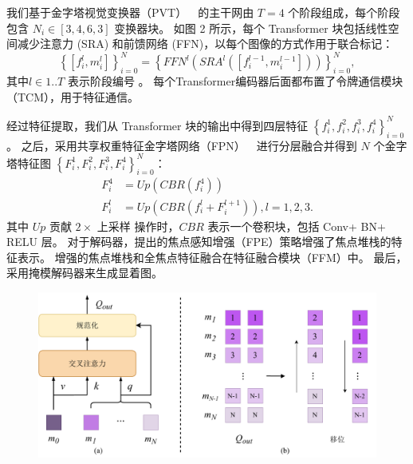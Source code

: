 %
%
%
%
%
\par
我们基于金字塔视觉变换器（PVT）~\cite{wang2022pvt}~的主干网由 $T = 4$ 个阶段组成，每个阶段包含
$ N_{i} \in [3,4,6,3] $ 变换器块。 如图 2 所示，每个 Transformer 块包括线性空间减少注意力 (SRA) 和前馈网络 (FFN)，以每个图像的方式作用于联合标记：
\begin{equation}
	\left \{ [f_{i}^{l}, m_{i}^{l}]\right \}_{i=0}^{N} = \left \{ FFN^{l} \left  ( SRA^{l} \left ( [f_{i}^{l-1}, m_{i}^{l-1}]\right )\right )\right \}_{i=0}^{N},
\end{equation}
其中$ l \in 1..T $ 表示阶段编号 。 每个Transformer编码器后面都布置了令牌通信模块（TCM），用于特征通信。 
%
%
%
%
%
\par
经过特征提取，我们从 Transformer 块的输出中得到四层特征 
$\left \{ f_{i}^{1},f_{i}^{2},f_{i}^{3},f_{i}^{4} \right \}_{i=0}^{N}$ 。 
之后，采用共享权重特征金字塔网络（FPN）~\cite{lin2017feature}~进行分层融合并得到 $N$ 个金字塔特征图	$ \left \{F_{i}^{1},F_{i}^{2},F_{i}^{3},F_{i}^{4} \right \}_{i=0}^{N}$：
\begin{equation}
	\begin{aligned}
		F_{i}^{4} &= Up \left ( CBR \left ( f_{i}^{4} \right )\right ) \\ 
		F_{i}^{l} &= Up \left ( CBR \left ( f_{i}^{l} + F_{i}^{l+1} \right )  \right ),l=1,2,3  .
	\end{aligned}
\end{equation}
其中 $Up$ 贡献 $2 \times $ 上采样 操作时，$CBR$ 表示一个卷积块，包括 Conv+ BN+ RELU 层。 对于解码器，提出的焦点感知增强（FPE）策略增强了焦点堆栈的特征表示。 增强的焦点堆栈和全焦点特征融合在特征融合模块（FFM）中。 最后，采用掩模解码器来生成显着图。
%
%
%
%
%
%
%
%
%
%
\begin{figure}[!ht]
	\centering
	\includegraphics[width=0.95\linewidth]{figures/chapter3/token-interaction.drawio}
	\label{cpt3_fig1:idea}
\end{figure}
